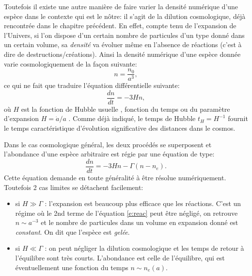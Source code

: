 Toutefois il existe une autre manière de faire varier la densité numérique d'une espèce dans le contexte qui est le nôtre: il s'agit de la dilution cosmologique, déjà rencontrée dans le chapitre précédent. En effet, compte tenu de l'expansion de l'Univers, si l'on dispose d'un certain nombre de particules d'un type donné dans un certain volume, sa \textit{densité} va évoluer même en l'absence de réactions (c'est à dire de destructions/créations). Ainsi la densité numérique d'une espèce donnée varie cosmologiquement de la façon suivante:
\begin{equation}
n=\frac{n_0}{a^3},
\end{equation}
ce qui ne fait que traduire l'équation différentielle suivante:
\begin{equation}
\frac{dn}{dt}=-3Hn,
\end{equation}
où $H$ est la fonction de Hubble usuelle , fonction du temps ou du paramètre d'expansion $H=\dot a/a$ . Comme déjà indiqué, le temps de Hubble $t_H=H^{-1}$ fournit le temps caractéristique d'évolution significative des distances dans le cosmos.

Dans le cas cosmologique général, les deux procédés se superposent et l'abondance d'une espèce arbitraire est régie par une équation de type:
\begin{equation}
\frac{dn}{dt}=-3Hn-\Gamma (n-n_e).
\label{e:reac}
\end{equation}
Cette équation demande en toute généralité à être résolue numériquement. Toutefois 2 cas limites se détachent facilement:
\begin{itemize}
\item si $H\gg \Gamma$ : l'expansion est beaucoup plus efficace que les réactions. C'est un régime où le 2nd terme de l'équation \ref{e:reac} peut être négligé, on retrouve $n\sim a^{-3}$ et le nombre de particules dans un volume en expansion donné est \textit{constant}. On dit que l'espèce est \textit{gelée}.
\item si $H\ll \Gamma$ : on peut négliger la dilution cosmologique et les temps de retour à l'équilibre sont très courts. L'abondance est celle de l'équilibre, qui est éventuellement une fonction du temps $n\sim n_e(a)$.
\end{itemize}

